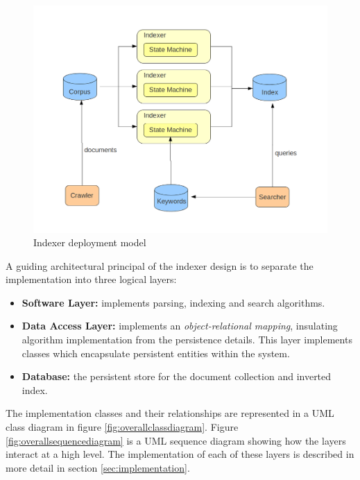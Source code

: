 \documentclass[10pt]{report}
\begin{document}
\begin{figure}
  \begin{center}
        \includegraphics[width=\textwidth,height=!]{deploymentmodel}
  \end{center}
  \caption{Indexer deployment model}
  \label{fig:deploymentmodel}
\end{figure} 

A guiding architectural principal of the indexer design is to separate the implementation
into three logical layers:
\begin{itemize}
\item \textbf{Software Layer:} implements parsing, indexing and search
  algorithms.
\item \textbf{Data Access Layer:} implements an
  \textit{object-relational mapping}, insulating algorithm
  implementation from the persistence details. This layer implements
  classes which encapsulate persistent entities within the system.
\item \textbf{Database:} the persistent store for the document
  collection and inverted index.
\end{itemize}

The implementation classes and their relationships are represented in
a UML class diagram in figure \ref{fig:overallclassdiagram}. Figure
\ref{fig:overallsequencediagram} is a UML sequence diagram showing how
the layers interact at a high level.  The implementation of each of
these layers is described in more detail in section
\ref{sec:implementation}.
\end{document}
